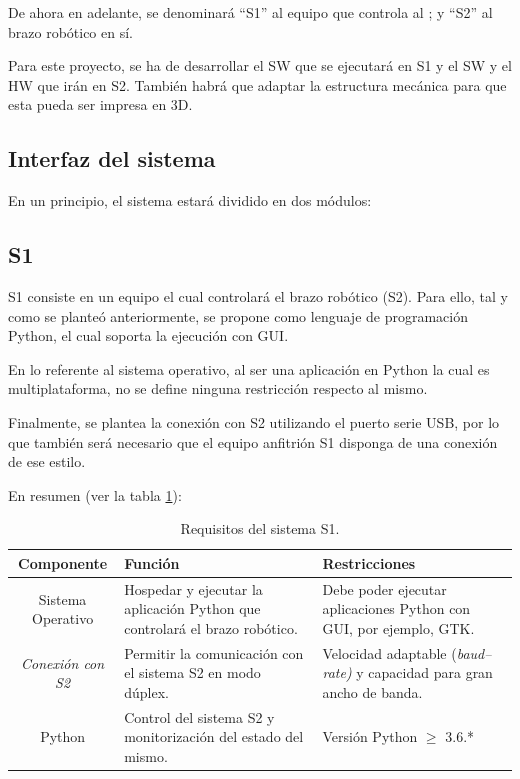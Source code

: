 De ahora en adelante, se denominará ``\ac{S1}'' al equipo que controla al \pArm{}; y ``\ac{S2}'' al brazo robótico en sí.

Para este proyecto, se ha de desarrollar el \ac{SW} que se ejecutará en \ac{S1} y el \ac{SW} y el \ac{HW} que irán en \ac{S2}.
También habrá que adaptar la estructura mecánica para que esta pueda ser impresa en 3D.

\subsection{Interfaz del sistema}
En un principio, el sistema estará dividido en dos módulos:

\subsection*{\ac{S1}}
\ac{S1} consiste en un equipo el cual controlará el brazo robótico (\ac{S2}). Para ello, tal y como se planteó anteriormente, se propone como lenguaje de programación Python, el cual soporta la ejecución con \ac{GUI}.

En lo referente al sistema operativo, al ser una aplicación en Python la cual es multiplataforma, no se define ninguna restricción respecto al mismo.

Finalmente, se plantea la conexión con \ac{S2} utilizando el puerto serie \ac{USB}, por lo que también será necesario que el equipo anfitrión \ac{S1} disponga de una conexión de ese estilo.

En resumen (ver la tabla \ref{tab:s1_requirements}):

\begin{table}[H]
    \centering
    \begin{tabularx}{\textwidth}{| c | X | X |}
        \hline
        \textbf{Componente} & \textbf{Función} & \textbf{Restricciones} \\
        \hline\hline
        Sistema Operativo & Hospedar y ejecutar la aplicación Python que controlará el brazo robótico. & Debe poder ejecutar aplicaciones Python con \ac{GUI}, por ejemplo, \ac{GTK}. \\
        \hline
        \textit{Conexión con \ac{S2}} & Permitir la comunicación con el sistema \ac{S2} en modo dúplex. & Velocidad adaptable (\textit{baud--rate)} y capacidad para gran ancho de banda. \\
        \hline
        Python & Control del sistema \ac{S2} y monitorización del estado del mismo. & Versión Python $\geqslant$ 3.6.* \\
        \hline
    \end{tabularx}
    \caption{Requisitos del sistema \ac{S1}.}
    \label{tab:s1_requirements}
\end{table}

